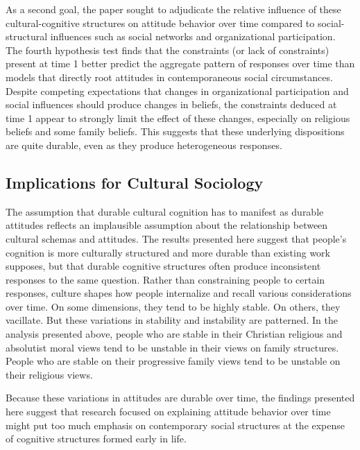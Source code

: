 \documentclass[12pt,]{article}
\begin{document}
As a second goal, the paper sought to adjudicate the relative influence of these cultural-cognitive structures on attitude behavior over time compared to social-structural influences such as social networks and organizational participation. The fourth hypothesis test finds that the constraints (or lack of constraints) present at time 1 better predict the aggregate pattern of responses over time than models that directly root attitudes in contemporaneous social circumstances. Despite competing expectations that changes in organizational participation and social influences should produce changes in beliefs, the constraints deduced at time 1 appear to strongly limit the effect of these changes, especially on religious beliefs and some family beliefs. This suggests that these underlying dispositions are quite durable, even as they produce heterogeneous responses.

\hypertarget{implications-for-cultural-sociology}{%
\subsection{Implications for Cultural Sociology}\label{implications-for-cultural-sociology}}

The assumption that durable cultural cognition has to manifest as durable attitudes reflects an implausible assumption about the relationship between cultural schemas and attitudes. The results presented here suggest that people's cognition is more culturally structured and more durable than existing work supposes, but that durable cognitive structures often produce inconsistent responses to the same question. Rather than constraining people to certain responses, culture shapes how people internalize and recall various considerations over time. On some dimensions, they tend to be highly stable. On others, they vacillate. But these variations in stability and instability are patterned. In the analysis presented above, people who are stable in their Christian religious and absolutist moral views tend to be unstable in their views on family structures. People who are stable on their progressive family views tend to be unstable on their religious views.

Because these variations in attitudes are durable over time, the findings presented here suggest that research focused on explaining attitude behavior over time might put too much emphasis on contemporary social structures at the expense of cognitive structures formed early in life.
\end{document}
